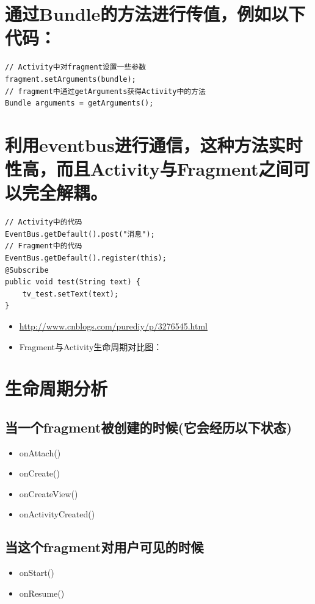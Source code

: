 \documentclass[9pt, b5paaper]{book}
\begin{document}
\section{通过Bundle的方法进行传值，例如以下代码：}
\label{sec-3-2}
\begin{verbatim}
// Activity中对fragment设置一些参数 
fragment.setArguments(bundle); 
// fragment中通过getArguments获得Activity中的方法 
Bundle arguments = getArguments();
\end{verbatim}
\section{利用eventbus进行通信，这种方法实时性高，而且Activity与Fragment之间可以完全解耦。}
\label{sec-3-3}
\begin{verbatim}
// Activity中的代码 
EventBus.getDefault().post("消息");  
// Fragment中的代码 
EventBus.getDefault().register(this); 
@Subscribe 
public void test(String text) { 
    tv_test.setText(text); 
}
\end{verbatim}

\begin{itemize}
\item \url{http://www.cnblogs.com/purediy/p/3276545.html}
\item Fragment与Activity生命周期对比图：
\end{itemize}

\section{生命周期分析}
\label{sec-3-4}
\subsection{当一个fragment被创建的时候(它会经历以下状态)}
\label{sec-3-4-1}
\begin{itemize}
\item onAttach()
\item onCreate()
\item onCreateView()
\item onActivityCreated()
\end{itemize}
\subsection{当这个fragment对用户可见的时候}
\label{sec-3-4-2}
\begin{itemize}
\item onStart()
\item onResume()
\end{itemize}
\end{document}
